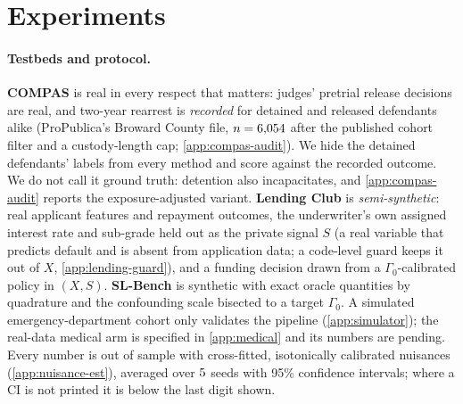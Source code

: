 \section{Experiments}
\label{sec:experiments}

\paragraph{Testbeds and protocol.} \textbf{COMPAS} is real in every respect
that matters: judges' pretrial release decisions are real, and two-year
rearrest is \emph{recorded} for detained and released defendants alike
(ProPublica's Broward County file, $n=6{,}054$ after the published
cohort filter and a custody-length cap; \cref{app:compas-audit}). We hide the
detained defendants' labels from every method and score against the recorded
outcome. We do not call it ground truth: detention also incapacitates, and
\cref{app:compas-audit} reports the exposure-adjusted variant.
\textbf{Lending Club} is \emph{semi-synthetic}: real applicant features and
repayment outcomes, the underwriter's own assigned interest rate and
sub-grade held out as the private signal $S$ (a real variable that predicts
default and is absent from application data; a code-level guard keeps it out
of $X$, \cref{app:lending-guard}), and a funding decision drawn from a
$\Gamma_0$-calibrated policy in $(X,S)$. \textbf{SL-Bench} is synthetic with
exact oracle quantities by quadrature and the confounding scale bisected to a
target $\Gamma_0$. A simulated emergency-department cohort only validates the
pipeline (\cref{app:simulator}); the real-data medical arm is specified in
\cref{app:medical} and its numbers are pending. Every number is out of sample with cross-fitted, isotonically
calibrated nuisances (\cref{app:nuisance-est}), averaged over
$5$ seeds with 95\% confidence intervals; where a CI is not
printed it is below the last digit shown.

